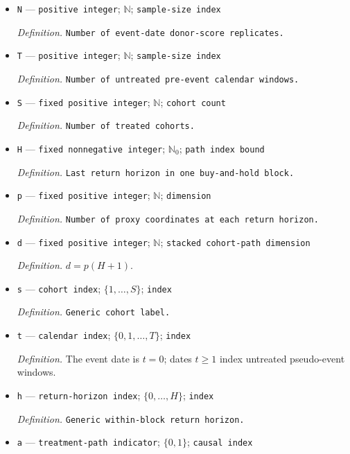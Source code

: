 \documentclass{article}
\begin{document}
\begin{itemize}
  \item \texttt{N} --- \texttt{positive integer}; \(\mathbb N\); \texttt{sample-\allowbreak{}size index}
  \par\smallskip\noindent\emph{Definition.} \texttt{Number of event-\allowbreak{}date donor-\allowbreak{}score replicates.}
  \item \texttt{T} --- \texttt{positive integer}; \(\mathbb N\); \texttt{sample-\allowbreak{}size index}
  \par\smallskip\noindent\emph{Definition.} \texttt{Number of untreated pre-\allowbreak{}event calendar windows.}
  \item \texttt{S} --- \texttt{fixed positive integer}; \(\mathbb N\); \texttt{cohort count}
  \par\smallskip\noindent\emph{Definition.} \texttt{Number of treated cohorts.}
  \item \texttt{H} --- \texttt{fixed nonnegative integer}; \(\mathbb N_0\); \texttt{path index bound}
  \par\smallskip\noindent\emph{Definition.} \texttt{Last return horizon in one buy-\allowbreak{}and-\allowbreak{}hold block.}
  \item \texttt{p} --- \texttt{fixed positive integer}; \(\mathbb N\); \texttt{dimension}
  \par\smallskip\noindent\emph{Definition.} \texttt{Number of proxy coordinates at each return horizon.}
  \item \texttt{d} --- \texttt{fixed positive integer}; \(\mathbb N\); \texttt{stacked cohort-\allowbreak{}path dimension}
  \par\smallskip\noindent\emph{Definition.} \(d=p(H+1)\).
  \item \texttt{s} --- \texttt{cohort index}; \(\{1,\ldots,S\}\); \texttt{index}
  \par\smallskip\noindent\emph{Definition.} \texttt{Generic cohort label.}
  \item \texttt{t} --- \texttt{calendar index}; \(\{0,1,\ldots,T\}\); \texttt{index}
  \par\smallskip\noindent\emph{Definition.} The event date is \(t=0\); dates \(t\ge1\) index untreated pseudo-event windows.
  \item \texttt{h} --- \texttt{return-\allowbreak{}horizon index}; \(\{0,\ldots,H\}\); \texttt{index}
  \par\smallskip\noindent\emph{Definition.} \texttt{Generic within-\allowbreak{}block return horizon.}
  \item \texttt{a} --- \texttt{treatment-\allowbreak{}path indicator}; \(\{0,1\}\); \texttt{causal index}

\end{itemize}
\end{document}
